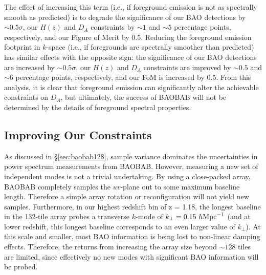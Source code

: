 \documentclass[10pt,iop]{emulateapj}
\begin{document}
The effect of increasing this term (i.e., if foreground emission is not as spectrally smooth as 
predicted) is to degrade the significance of our BAO detections by $\sim 0.5\sigma$, our $H(z)$
and $D_A$ constraints by $\sim1$ and $\sim5$ percentage points, respectively, 
and our Figure of Merit by 0.5.
Reducing the foreground emission footprint in $k$-space (i.e., if foregrounds are spectrally
smoother than predicted) has similar effects with the opposite sign: the significance of
our BAO detections are increased by $\sim 0.5\sigma$, our $H(z)$ and $D_A$ constraints are improved
by $\sim0.5$ and $\sim6$ percentage points, respectively, and our FoM is increased by 0.5.  From this analysis, it is clear
that foreground emission can significantly alter the achievable constraints on $D_A$, but 
ultimately, the success of BAOBAB will not be determined by the details of foreground spectral
properties.

\subsection{Improving Our Constraints}
\label{sec:improving}

As discussed in \S\ref{sec:baobab128}, sample variance dominates the
uncertainties in power spectrum measurements from BAOBAB.  However, measuring
a new set of independent modes is not a trivial undertaking.  By using a close-packed array,
BAOBAB completely samples the $uv$-plane out to some maximum baseline length.  Therefore a simple
array rotation or reconfiguration will not yield new samples.  Furthermore, in our highest redshift bin of z = 1.18, the longest baseline in the 132-tile array probes a transverse $k$-mode of 
$k_{\perp} = 0.15~h{\rm Mpc}^{-1}$ (and at lower redshift, this longest baseline corresponds
to an even larger value of $k_{\perp}$).  At this scale and smaller, most BAO information is being 
lost to non-linear damping effects.  Therefore, the returns from increasing the array size beyond 
$\sim128$ tiles are limited, since effectively no new modes with significant BAO information will be
probed.
\end{document}
